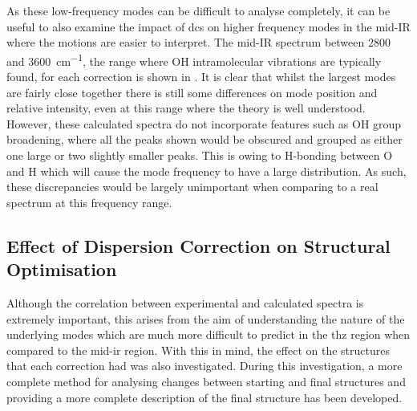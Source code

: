 As these low\nobreakdash-frequency modes can be difficult to analyse completely, it can be useful to also examine the impact of \acrshort{dc}s on higher frequency modes in the mid\nobreakdash-IR where the motions \DIFdelbegin {}\DIFdelend \DIFaddbegin {}\DIFaddend are easier to interpret. The mid\nobreakdash-IR spectrum between 2800 and \SI{3600}{cm^{-1}}, the range where OH intramolecular vibrations are typically found, for each correction is shown in . It is clear that whilst the largest modes are fairly close together there is still some differences on mode position and relative intensity, even at this range where the theory is well understood. However, these calculated spectra do not incorporate features such as OH group broadening, where all the peaks shown would be obscured and grouped as either one large or two slightly smaller peaks. This is owing to \DIFaddbegin {}\DIFaddend H\nobreakdash-bonding between O and H which will cause the mode frequency to have a large distribution. As such, these discrepancies would be largely unimportant when comparing to a real spectrum at this frequency range.

\subsection{Effect of Dispersion Correction on Structural Optimisation}
Although the correlation between experimental and calculated spectra is extremely important, this arises from the aim of understanding the nature of the underlying modes which are much more difficult to predict in the \acrshort{thz} region when compared to the mid\nobreakdash-\acrshort{ir} region. With this in mind, the effect on the structures that each correction had was also investigated. During this investigation, a more complete method for analysing changes between starting and final structures and providing a more complete description of the final structure has been developed.

